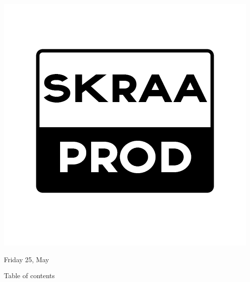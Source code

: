 \documentclass[12pt]{article}
\begin{document}
\begin{center}
	\includegraphics[scale = 0.80]{New_logo.png}\\[1cm] %
\end{center}



\newpage
{\large Friday 25, May}\\[2cm] %
\begin{center}

\Large Table of contents\\[2.5cm]

\end{center}
 
\tableofcontents

\vfill %
\end{document}

